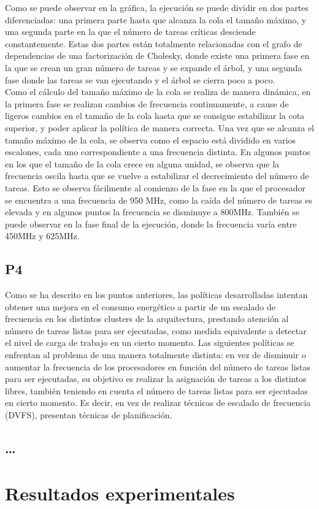 Como se puede observar en la gráfica, la ejecución se puede dividir en dos
partes diferenciadas: una primera parte hasta que alcanza la cola el tamaño
máximo, y una segunda parte en la que el número de tareas críticas
desciende constantemente. Estas dos partes están totalmente relacionadas
con el grafo de dependencias de una factorización de Cholesky, donde existe
una primera fase en la que se crean un gran número de tareas y se expande
el árbol, y una segunda fase donde las tareas se van ejecutando y el árbol
se cierra poco a poco.\\
Como el cálculo del tamaño máximo de la cola se realiza de manera dinámica,
en la primera fase se realizan cambios de frecuencia continuamente, a cause
de ligeros cambios en el tamaño de la cola hasta que se consigue
estabilizar la cota superior, y poder aplicar la política de manera
correcta. Una vez que se alcanza el tamaño máximo de la cola, se observa
como el espacio está dividido en varios escalones, cada uno correspondiente
a una frecuencia distinta. En algunos puntos en los que el tamaño de la
cola crece en alguna unidad, se observa que la frecuencia oscila hasta que
se vuelve a estabilizar el decrecimiento del número de tareas. Esto se
observa fácilmente al comienzo de la fase en la que el procesador se
encuentra a una frecuencia de 950 MHz, como la caída del número de tareas
es elevada y en algunos puntos la frecuencia se disminuye a 800MHz. También
se puede observar en la fase final de la ejecución, donde la frecuencia
varía entre 450MHz y 625MHz.


\subsection{P4}
Como se ha descrito en los puntos anteriores, las políticas desarrolladas
intentan obtener una mejora en el consumo energético a partir de un
escalado de frecuencia en los distintos clusters de la arquitectura,
prestando atención al número de tareas listas para ser ejecutadas, como
medida equivalente a detectar el nivel de carga de trabajo en un cierto
momento. Las siguientes políticas se enfrentan al problema de una manera
totalmente distinta: en vez de disminuir o aumentar la frecuencia de los
procesadores en función del número de tareas listas para ser ejecutadas, su
objetivo es realizar la asignación de tareas a los distintos \wts libres,
también teniendo en cuenta el número de tareas listas para ser ejecutadas
en cierto momento. Es decir, en vez de realizar técnicas de escalado de
frecuencia (DVFS), presentan técnicas de planificación.

\subsection{\ldots}


\section{Resultados experimentales}



